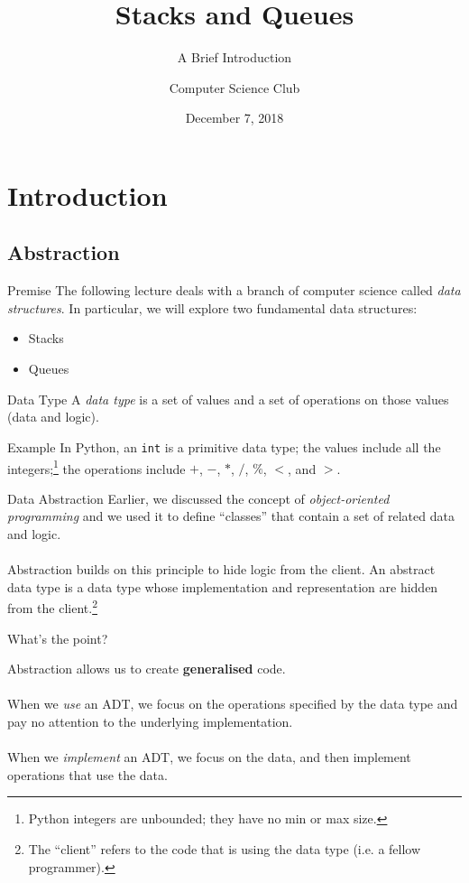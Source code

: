 \documentclass{beamer}
\title[Stacks and Queues]{\textbf{Stacks and Queues}}
\subtitle{A Brief Introduction}
\institute{Stephen Lewis Secondary School}
\author{Computer Science Club}
\date{December 7, 2018}
\begin{document}
\begin{frame} 
\titlepage 
\end{frame}

\section{Introduction}
\subsection{Abstraction}
\begin{frame}{Premise}
The following lecture deals with a branch of computer science called \textit{data structures}. In particular, we will explore two fundamental data structures:
\begin{itemize}
    \item Stacks
    \item Queues
\end{itemize}

\end{frame}

\begin{frame}{Data Type}
A \textit{data type} is a set of values and a set of operations on those values (data and logic).

\begin{block}{Example}
In Python, an \lstinline[language=iPython]{int} is a primitive data type; the values include all the integers;\footnote[frame]{Python integers are unbounded; they have no min or max size.} the operations include $+$, $-$, $*$, $/$, $\%$, $<$, and $>$.
\end{block}
\end{frame}

\begin{frame}{Data Abstraction}
Earlier, we discussed the concept of \textit{object-oriented programming} and we used it to define ``classes'' that contain a set of related data and logic.\\~\\
Abstraction builds on this principle to hide logic from the client. An abstract data type is a data type whose implementation and representation are hidden from the client.\footnote[frame]{The ``client'' refers to the code that is using the data type (i.e. a fellow programmer).}
\end{frame}

\begin{frame}{What's the point?}

Abstraction allows us to create \textbf{generalised} code.\\~\\
When we \textit{use} an ADT, we focus on the operations specified by the data type and pay no attention to the underlying implementation.\\~\\

When we \textit{implement} an ADT, we focus on the data, and then implement operations that use the data.
\end{frame}
\end{document}
